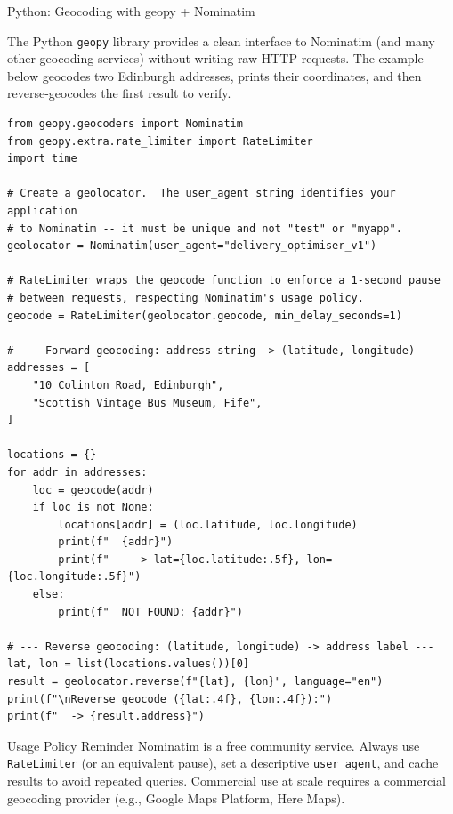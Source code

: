 \documentclass[aspectratio=169,10pt]{beamer}
\begin{document}
\begin{frame}[fragile]{Python: Geocoding with geopy + Nominatim}

  The Python \texttt{geopy} library provides a clean interface to Nominatim
  (and many other geocoding services) without writing raw HTTP requests.
  The example below geocodes two Edinburgh addresses, prints their coordinates,
  and then reverse-geocodes the first result to verify.

\begin{lstlisting}[style=pycode, caption={Forward and reverse geocoding using geopy}]
from geopy.geocoders import Nominatim
from geopy.extra.rate_limiter import RateLimiter
import time

# Create a geolocator.  The user_agent string identifies your application
# to Nominatim -- it must be unique and not "test" or "myapp".
geolocator = Nominatim(user_agent="delivery_optimiser_v1")

# RateLimiter wraps the geocode function to enforce a 1-second pause
# between requests, respecting Nominatim's usage policy.
geocode = RateLimiter(geolocator.geocode, min_delay_seconds=1)

# --- Forward geocoding: address string -> (latitude, longitude) ---
addresses = [
    "10 Colinton Road, Edinburgh",
    "Scottish Vintage Bus Museum, Fife",
]

locations = {}
for addr in addresses:
    loc = geocode(addr)
    if loc is not None:
        locations[addr] = (loc.latitude, loc.longitude)
        print(f"  {addr}")
        print(f"    -> lat={loc.latitude:.5f}, lon={loc.longitude:.5f}")
    else:
        print(f"  NOT FOUND: {addr}")

# --- Reverse geocoding: (latitude, longitude) -> address label ---
lat, lon = list(locations.values())[0]
result = geolocator.reverse(f"{lat}, {lon}", language="en")
print(f"\nReverse geocode ({lat:.4f}, {lon:.4f}):")
print(f"  -> {result.address}")
\end{lstlisting}

  \begin{alertblock}{Usage Policy Reminder}
    Nominatim is a free community service.  Always use \texttt{RateLimiter}
    (or an equivalent pause), set a descriptive \texttt{user\_agent}, and
    cache results to avoid repeated queries.  Commercial use at scale requires
    a commercial geocoding provider (e.g., Google Maps Platform, Here Maps).
  \end{alertblock}

\end{frame}
\end{document}
